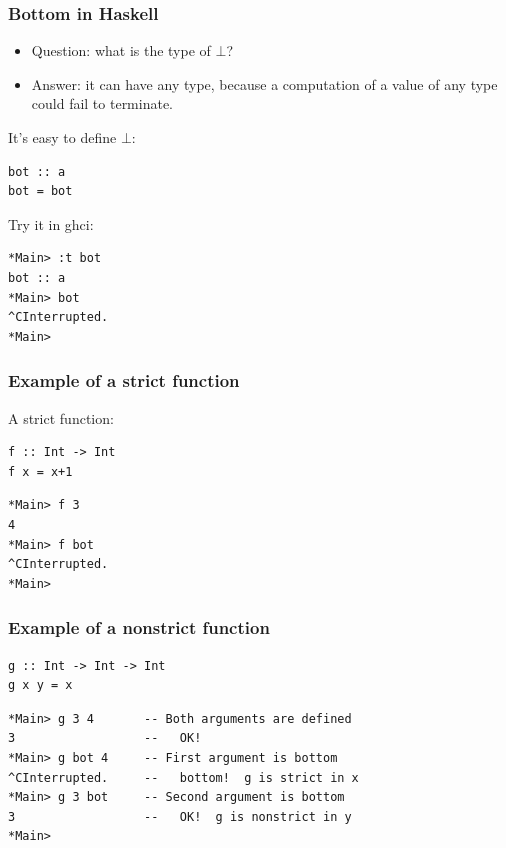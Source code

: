\documentclass{beamer}
\begin{document}
\begin{frame}[fragile]
\frametitle{Bottom in Haskell}

\begin{itemize}
\item Question: what is the type of $\bot$?
\item Answer: it can have any type, because a computation of a
  value of any type could fail to terminate.
\end{itemize}

It's easy to define $\bot$:

\begin{verbatim}
bot :: a
bot = bot
\end{verbatim}

Try it in ghci:

\begin{verbatim}
*Main> :t bot
bot :: a
*Main> bot
^CInterrupted.
*Main> 
\end{verbatim}

\end{frame}

\begin{frame}[fragile]
\frametitle{Example of a strict function}

A strict function:

\begin{verbatim}
f :: Int -> Int
f x = x+1
\end{verbatim}

\begin{verbatim}
*Main> f 3
4
*Main> f bot
^CInterrupted.
*Main> 
\end{verbatim}

\end{frame}

\begin{frame}[fragile]
\frametitle{Example of a nonstrict function}

\begin{verbatim}
g :: Int -> Int -> Int
g x y = x
\end{verbatim}

\begin{verbatim}
*Main> g 3 4       -- Both arguments are defined
3                  --   OK!
*Main> g bot 4     -- First argument is bottom
^CInterrupted.     --   bottom!  g is strict in x
*Main> g 3 bot     -- Second argument is bottom
3                  --   OK!  g is nonstrict in y
*Main> 
\end{verbatim}

\end{frame}
\end{document}

